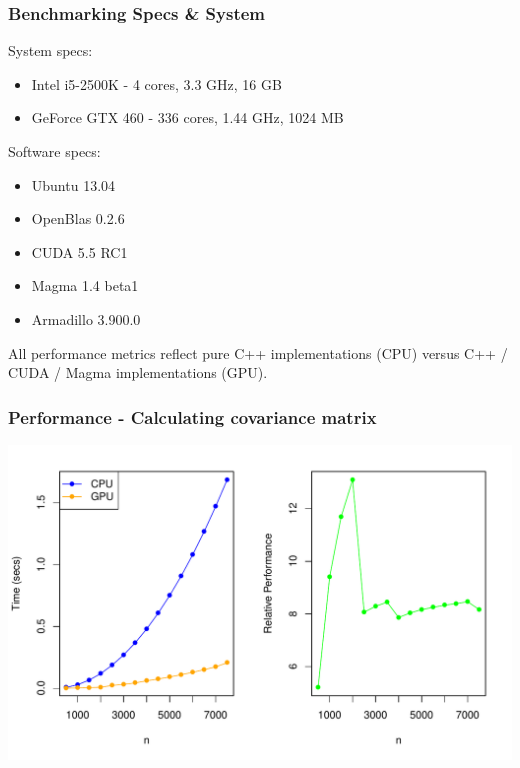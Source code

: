 \documentclass[slidestop,mathserif]{beamer}
\begin{document}
\begin{frame}
\frametitle{Benchmarking Specs \& System}

System specs:
\begin{itemize}
\item Intel i5-2500K - 4 cores, 3.3 GHz, 16 GB
\item GeForce GTX 460 - 336 cores, 1.44 GHz, 1024 MB
\end{itemize}

\vspace{5mm}

Software specs:
\begin{itemize}
\item Ubuntu 13.04
\item OpenBlas 0.2.6
\item CUDA 5.5 RC1
\item Magma 1.4 beta1
\item Armadillo 3.900.0 
\end{itemize}

\vspace{5mm}

All performance metrics reflect pure C++ implementations (CPU) versus C++ / CUDA / Magma implementations (GPU).

\end{frame}


\begin{frame}
\frametitle{Performance - Calculating covariance matrix}

\begin{center}
\includegraphics[width=\textwidth]{figs/cov_bench.pdf}
\end{center}

\end{frame}
\end{document}
